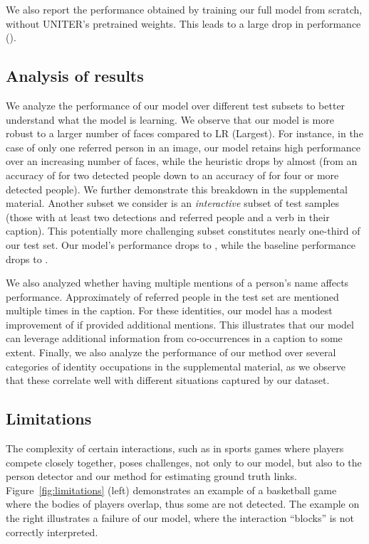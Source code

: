We also report the performance obtained by training our full model 
from scratch, without UNITER's pretrained weights. This leads to a large drop in performance (). 


\subsection{Analysis of results}

We analyze the performance of our model over different test subsets to better understand what the model is learning. 
We observe that our model is more robust to a larger number of faces compared to LR (Largest). For instance, in the case of only one referred person in an image, our model retains high performance over an increasing number of faces, while the heuristic drops by almost  (from an accuracy of  for two detected people down to an accuracy of  for four or more detected people). We further demonstrate this breakdown in the supplemental material.
Another subset we consider is an \emph{interactive} subset of test samples (\ie those with at least two detections and referred people and a verb in their caption). 
This potentially more challenging subset constitutes nearly one-third of our test set.
Our model's performance drops to , while the baseline performance drops to .

We also analyzed whether having multiple mentions of a person's name affects performance. Approximately  of referred people in the test set are mentioned multiple times in the caption. For these identities, our model has a modest improvement of  if provided additional mentions. This illustrates that our model can leverage additional information from co-occurrences in a caption to some extent.
Finally, we also analyze the performance of our method over several categories of identity occupations in the supplemental material, as we observe that these correlate well with different situations captured by our dataset.

\subsection{Limitations}

The complexity of certain interactions, such as in sports games where players compete closely together, poses challenges, not only to our model, but also to the person detector and our method for estimating ground truth links. Figure~\ref{fig:limitations} (left) demonstrates an example of a basketball game where the bodies of players overlap, thus some are not detected. The example on the right illustrates a failure of our model, where the interaction ``blocks'' is not correctly interpreted.

